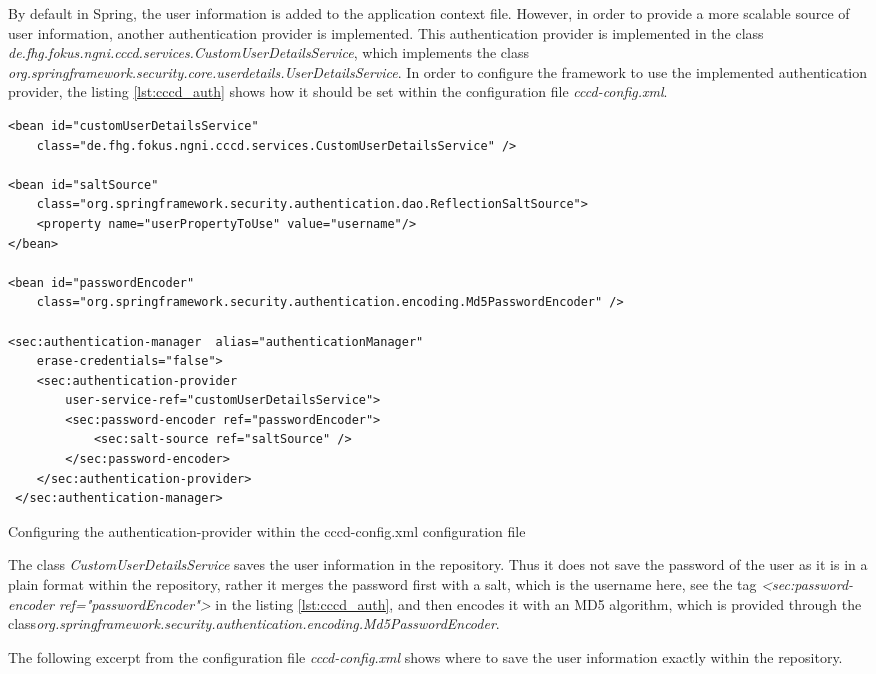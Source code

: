 By default in Spring, the user information is added to the application context file. However, in order to provide a more scalable source of user information, another authentication provider is implemented. This authentication provider is implemented in the class \textit{de.fhg.fokus.ngni.cccd.services.CustomUserDetailsService}, which implements the class  \textit{org.springframework.security.core.userdetails.UserDetailsService}. In order to configure the framework to use the implemented authentication provider, the listing \ref{lst:cccd_auth} shows how it should be set within the configuration file \textit{cccd-config.xml}.

\begin{code}
\begin{verbatim}
<bean id="customUserDetailsService" 
	class="de.fhg.fokus.ngni.cccd.services.CustomUserDetailsService" />

<bean id="saltSource" 
	class="org.springframework.security.authentication.dao.ReflectionSaltSource">
	<property name="userPropertyToUse" value="username"/>
</bean>

<bean id="passwordEncoder" 
	class="org.springframework.security.authentication.encoding.Md5PasswordEncoder" />

<sec:authentication-manager  alias="authenticationManager" 
	erase-credentials="false">
	<sec:authentication-provider 
		user-service-ref="customUserDetailsService">
 		<sec:password-encoder ref="passwordEncoder">
 			<sec:salt-source ref="saltSource" />
 		</sec:password-encoder>
 	</sec:authentication-provider>
 </sec:authentication-manager>
\end{verbatim}
\caption{Configuring the authentication-provider within the cccd-config.xml configuration file}
\label{lst:cccd_auth}
\end{code}

The class \textit{CustomUserDetailsService} saves the user information in the repository. Thus it does not save the password of the user as it is in a plain format within the repository, rather it merges the password first with a salt, which is the username here, see the tag \textit{<sec:password-encoder ref="passwordEncoder">} in the listing \ref{lst:cccd_auth}, and then encodes it with an MD5 algorithm, which is provided through the class\textit{org.springframework.security.authentication.encoding.Md5PasswordEncoder}.

The following excerpt from the configuration file \textit{cccd-config.xml} shows where to save the user information exactly within the repository.

